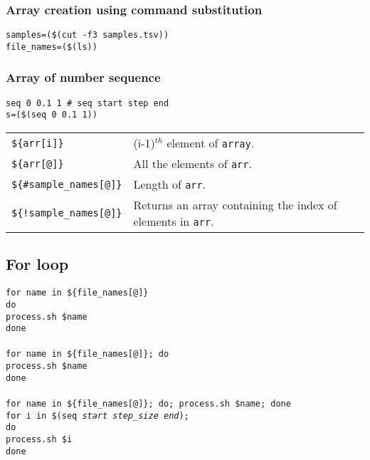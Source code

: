\subsubsection{Array creation using command substitution}
\begin{mdframed}
\texttt{samples=(\$(cut -f3 samples.tsv))}\\
\texttt{file\_names=(\$(ls))}
\end{mdframed}


\subsubsection{Array of number sequence}

\begin{mdframed}
\texttt{seq 0 0.1 1 \# seq start step end}\\
\texttt{s=(\$(seq 0 0.1 1))}
\end{mdframed}


\begin{tabularx}{\linewidth}{lX}
\texttt{\$\{arr[i]\}} & (i-1)$^{th}$ element of \texttt{array}.\\
\texttt{\$\{arr[@]\}} & All the elements of \texttt{arr}.\\
\texttt{\$\{\#sample\_names[@]\}} & Length of \texttt{arr}.\\
\texttt{\$\{!sample\_names[@]\}} & Returns an array containing the index of elements in \texttt{arr}.\\
\end{tabularx}

\subsection{For loop}


\begin{mdframed}
\texttt{for name in \$\{file\_names[@]\}}\\
\texttt{do}\\
\quad\texttt{process.sh \$name}\\
\texttt{done}\\
\null\\
\texttt{for name in \$\{file\_names[@]\}; do}\\
\quad\texttt{process.sh \$name}\\
\texttt{done}\\
\null\\
\texttt{for name in \$\{file\_names[@]\}; do; process.sh \$name; done }\\
\texttt{for i in \$(seq \textit{start} \textit{step\_size} \textit{end});}\\
\texttt{do}\\
\texttt{process.sh \$i}\\
\texttt{done}
\end{mdframed}




